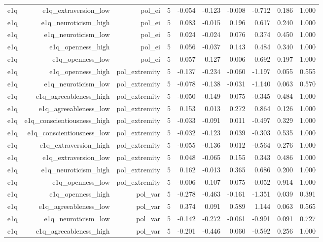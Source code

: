 \documentclass[11pt]{article}
\begin{document}
\begin{landscape}
\begin{longtable}{@{}lrrrrrrrrr@{}}
e1q & e1q\_extraversion\_low & pol\_ei & 5 & -0.054 & -0.123 & -0.008 & -0.712 & 0.186 & 1.000 \\
e1q & e1q\_neuroticism\_high & pol\_ei & 5 & 0.083 & -0.015 & 0.196 & 0.617 & 0.240 & 1.000 \\
e1q & e1q\_neuroticism\_low & pol\_ei & 5 & 0.024 & -0.024 & 0.076 & 0.374 & 0.450 & 1.000 \\
e1q & e1q\_openness\_high & pol\_ei & 5 & 0.056 & -0.037 & 0.143 & 0.484 & 0.340 & 1.000 \\
e1q & e1q\_openness\_low & pol\_ei & 5 & -0.057 & -0.127 & 0.006 & -0.692 & 0.197 & 1.000 \\
e1q & e1q\_openness\_high & pol\_extremity & 5 & -0.137 & -0.234 & -0.060 & -1.197 & 0.055 & 0.555 \\
e1q & e1q\_neuroticism\_low & pol\_extremity & 5 & -0.078 & -0.138 & -0.031 & -1.140 & 0.063 & 0.570 \\
e1q & e1q\_agreeableness\_high & pol\_extremity & 5 & -0.050 & -0.149 & 0.075 & -0.345 & 0.484 & 1.000 \\
e1q & e1q\_agreeableness\_low & pol\_extremity & 5 & 0.153 & 0.013 & 0.272 & 0.864 & 0.126 & 1.000 \\
e1q & e1q\_conscientiousness\_high & pol\_extremity & 5 & -0.033 & -0.091 & 0.011 & -0.497 & 0.329 & 1.000 \\
e1q & e1q\_conscientiousness\_low & pol\_extremity & 5 & -0.032 & -0.123 & 0.039 & -0.303 & 0.535 & 1.000 \\
e1q & e1q\_extraversion\_high & pol\_extremity & 5 & -0.055 & -0.136 & 0.012 & -0.564 & 0.276 & 1.000 \\
e1q & e1q\_extraversion\_low & pol\_extremity & 5 & 0.048 & -0.065 & 0.155 & 0.343 & 0.486 & 1.000 \\
e1q & e1q\_neuroticism\_high & pol\_extremity & 5 & 0.162 & -0.013 & 0.365 & 0.686 & 0.200 & 1.000 \\
e1q & e1q\_openness\_low & pol\_extremity & 5 & -0.006 & -0.107 & 0.075 & -0.052 & 0.914 & 1.000 \\
e1q & e1q\_openness\_high & pol\_var & 5 & -0.278 & -0.463 & -0.161 & -1.351 & 0.039 & 0.391 \\
e1q & e1q\_agreeableness\_low & pol\_var & 5 & 0.374 & 0.091 & 0.589 & 1.144 & 0.063 & 0.565 \\
e1q & e1q\_neuroticism\_low & pol\_var & 5 & -0.142 & -0.272 & -0.061 & -0.991 & 0.091 & 0.727 \\
e1q & e1q\_agreeableness\_high & pol\_var & 5 & -0.201 & -0.446 & 0.060 & -0.592 & 0.256 & 1.000 \\

\end{longtable}
\end{landscape}
\end{document}
